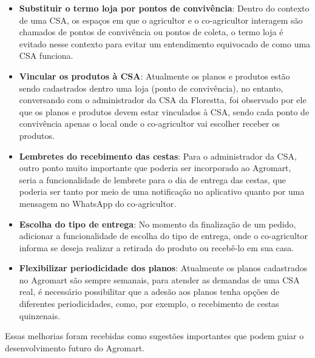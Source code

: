 \begin{itemize}
    \item \textbf{Substituir o termo loja por pontos de convivência}: Dentro do contexto de uma CSA, os espaços em que o agricultor e o co-agricultor interagem são chamados de pontos de convivência ou pontos de coleta, o termo loja é evitado nesse contexto para evitar um entendimento equivocado de como uma CSA funciona.
    \item \textbf{Vincular os produtos à CSA}: Atualmente os planos e produtos estão sendo cadastrados dentro uma loja (ponto de convivência), no entanto, conversando com o administrador da CSA da Florestta, foi observado por ele que os planos e produtos devem estar vinculados à CSA, sendo cada ponto de convivência apenas o local onde o co-agricultor vai escolher receber os produtos.
    \item \textbf{Lembretes do recebimento das cestas}: Para o administrador da CSA, outro ponto muito importante que poderia ser incorporado ao Agromart, seria a funcionalidade de lembrete para o dia de entrega das cestas, que poderia ser tanto por meio de uma notificação no aplicativo quanto por uma mensagem no WhatsApp do co-agricultor.
    \item \textbf{Escolha do tipo de entrega}: No momento da finalização de um pedido, adicionar a funcionalidade de escolha do tipo de entrega, onde o co-agricultor informa se deseja realizar a retirada do produto ou recebê-lo em sua casa.
    \item \textbf{Flexibilizar periodicidade dos planos}: Atualmente os planos cadastrados no Agromart são sempre semanais, para atender as demandas de uma CSA real, é necessário possibilitar que a adesão aos planos tenha opções de diferentes periodicidades, como, por exemplo, o recebimento de cestas quinzenais.
\end{itemize}

Essas melhorias foram recebidas como sugestões importantes que podem guiar o desenvolvimento futuro do Agromart.